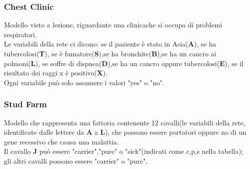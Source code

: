 \documentclass[a4paper]{article}
\begin{document}
\subsubsection{Chest Clinic}
Modello visto a lezione, riguardante una clinicache si occupa di problemi respiratori.\\
Le variabili della rete ci dicono: se il paziente è stato in Asia(\textbf{A}), se ha tubercolosi(\textbf{T}), se è fumatore(\textbf{S}),se ha bronchite(\textbf{B}),se ha un cancro ai polmoni(\textbf{L}), se soffre di dispnea(\textbf{D}),se ha un cancro oppure tubercolosi(\textbf{E}), se il risultato dei raggi x è positivo(\textbf{X}).\\
Ogni variabile può solo assumere i valori "yes" o "no".
\begin{table}[H]
\end{table}
\subsubsection{Stud Farm}
Modello che rappresenta una fattoria contenente 12 cavalli(le variabili della rete, identificate dalle lettere da \textbf{A} a \textbf{L}), che possono essere portatori oppure no di un gene recessivo che causa una malattia.\\
Il cavallo \textbf{J} può essere "carrier","pure" o "sick"(indicati come c,p,s nella tabella); gli altri cavalli possono essere "carrier" o "pure".
\begin{table}[H]
\end{table}
\end{document}
